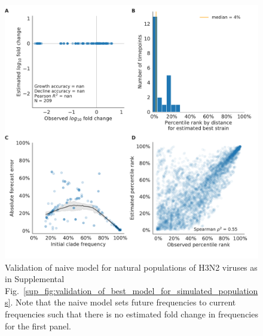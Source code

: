 \begin{figure}[H]
  \begin{center}
  \includegraphics[width=\textwidth]{figures/validation_figure_natural-natural_sample_1_with_90_vpm_sliding-naive.pdf}
  \caption{
  Validation of naive model for natural populations of H3N2 viruses as in Supplemental Fig.~\ref{sup_fig:validation_of_best_model_for_simulated_populations}.
  Note that the naive model sets future frequencies to current frequencies such that there is no estimated fold change in frequencies for the first panel.
  }
  \label{sup_fig:validation_of_naive_model_for_natural_populations}
  \end{center}
\end{figure}

